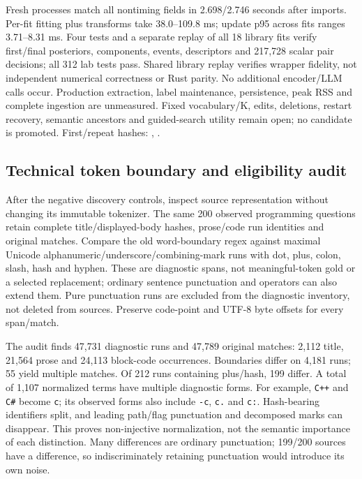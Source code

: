 \documentclass[11pt]{article}
\begin{document}
Fresh processes match all nontiming fields in 2.698/2.746 seconds after imports.
Per-fit fitting plus transforms take 38.0--109.8 ms; update p95 across fits
ranges 3.71--8.31 ms. Four tests and a separate replay of all 18 library fits
verify first/final posteriors, components, events, descriptors and 217,728 scalar
pair decisions; all 312 lab tests pass. Shared library replay verifies wrapper
fidelity, not independent numerical correctness or Rust parity. No additional
encoder/LLM calls occur. Production extraction, label maintenance, persistence,
peak RSS and complete ingestion are unmeasured. Fixed vocabulary/K, edits,
deletions, restart recovery, semantic ancestors and guided-search utility remain
open; no candidate is promoted.
First/repeat hashes:
,
.

\subsection{Technical token boundary and eligibility audit}
After the negative discovery controls, inspect source representation without
changing its immutable tokenizer. The same 200 observed programming questions
retain complete title/displayed-body hashes, prose/code run identities and
original matches. Compare the old word-boundary regex against maximal Unicode
alphanumeric/underscore/combining-mark runs with dot, plus, colon, slash, hash
and hyphen. These are diagnostic spans, not meaningful-token gold or a selected
replacement; ordinary sentence punctuation and operators can also extend them.
Pure punctuation runs are excluded from the diagnostic inventory, not deleted
from sources. Preserve code-point and UTF-8 byte offsets for every span/match.

The audit finds 47,731 diagnostic runs and 47,789 original matches: 2,112 title,
21,564 prose and 24,113 block-code occurrences. Boundaries differ on 4,181 runs;
55 yield multiple matches. Of 212 runs containing plus/hash, 199 differ. A total
of 1,107 normalized terms have multiple diagnostic forms. For example,
\texttt{C++} and \texttt{C\#} become \texttt{c}; its observed forms also include
\texttt{-c}, \texttt{c.} and \texttt{c:}. Hash-bearing identifiers split, and
leading path/flag punctuation and decomposed marks can disappear. This proves
non-injective normalization, not the semantic importance of each distinction.
Many differences are ordinary punctuation; 199/200 sources have a difference,
so indiscriminately retaining punctuation would introduce its own noise.
\end{document}
